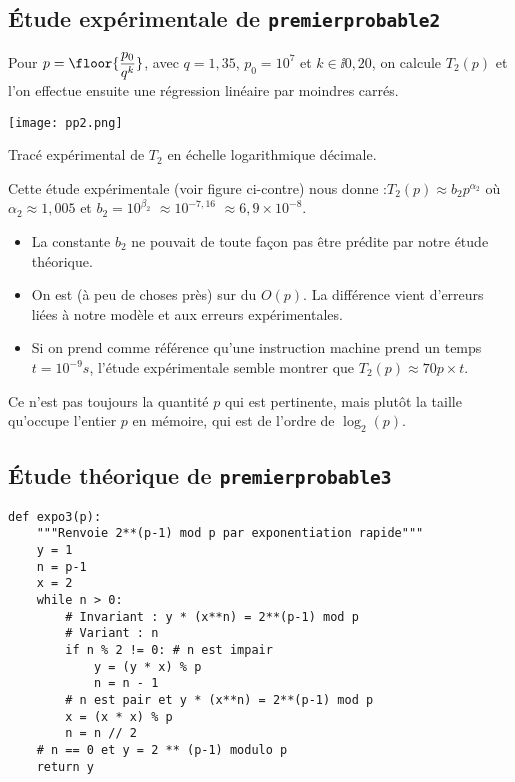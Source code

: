 \subsection{Étude expérimentale de \texttt{premierprobable2}}
Pour $p = \floor{\dfrac{p_0}{q^k}}$, avec $q = 1,35$, $p_0 = 10^7$ et $k\in\ii{0,20}$, on calcule $T_2(p)$ et l'on effectue ensuite une régression linéaire par moindres carrés.





  \begin{marginfigure}
    \texttt{[image: pp2.png]}
    \caption{Tracé expérimental de $T_2$ en échelle logarithmique décimale.}
    \label{fig.pp2}
 \end{marginfigure}

Cette étude expérimentale (voir figure ci-contre)%
  nous donne :$ T_{2}(p)\approx b_{2} p^{\alpha_{2}}$ où $\alpha_{2}\approx 1,005$ 
   et $b_{2} = 10^{\beta_{2}}$ $\approx 10^{-7,16}$ $\approx 6,9\times 10^{-8}$.

\begin{itemize}
\item La constante $b_{2}$ ne pouvait de toute façon pas être prédite
  par notre étude théorique.
\item On est (à peu de choses près) sur du $O(p)$. La différence vient
  d'erreurs liées à notre modèle et aux erreurs expérimentales.
\item Si on prend comme référence qu'une instruction machine prend
  un temps $t = 10^{-9}s$, l'étude expérimentale semble montrer que
  $T_{2}(p)\approx 70 p \times t$.
\end{itemize}


\begin{remarque}
  Ce n'est pas toujours la quantité $p$ qui est pertinente, mais plutôt la taille qu'occupe l'entier $p$ en mémoire, qui est de l'ordre de $\log_2(p)$.
\end{remarque}


\subsection{Étude théorique de \texttt{premierprobable3}}

\begin{lstlisting}
def expo3(p):     
    """Renvoie 2**(p-1) mod p par exponentiation rapide"""
    y = 1
    n = p-1
    x = 2
    while n > 0:
        # Invariant : y * (x**n) = 2**(p-1) mod p
        # Variant : n
        if n % 2 != 0: # n est impair
            y = (y * x) % p
            n = n - 1
        # n est pair et y * (x**n) = 2**(p-1) mod p
        x = (x * x) % p
        n = n // 2
    # n == 0 et y = 2 ** (p-1) modulo p
    return y
\end{lstlisting}

